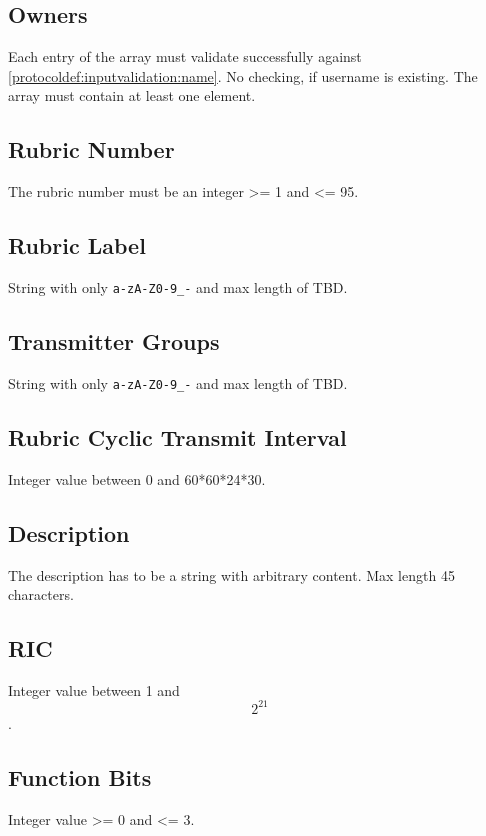 \subsection{Owners}
\label{protocoldef:inputvalidation:owners}
Each entry of the array must validate successfully against \ref{protocoldef:inputvalidation:name}. No checking, if username is existing. The array must contain at least one element.

\subsection{Rubric Number}
\label{protocoldef:inputvalidation:rubricnumber}
The rubric number must be an integer >= 1 and <= 95.

\subsection{Rubric Label}
\label{protocoldef:inputvalidation:rubriclabel}
String with only \verb|a-zA-Z0-9_-| and max length of TBD.

\subsection{Transmitter Groups}
\label{protocoldef:inputvalidation:transmittergroup}
String with only \verb|a-zA-Z0-9_-| and max length of TBD.

\subsection{Rubric Cyclic Transmit Interval}
\label{protocoldef:inputvalidation:cyclic_transmit_interval}
Integer value between 0 and 60*60*24*30.

\subsection{Description}
\label{protocoldef:inputvalidation:description}
The description has to be a string with arbitrary content. Max length 45 characters.

\subsection{RIC}
\label{protocoldef:inputvalidation:ric}
Integer value between 1 and $$2^21$$.

\subsection{Function Bits}
\label{protocoldef:inputvalidation:function}
Integer value >= 0 and <= 3.

